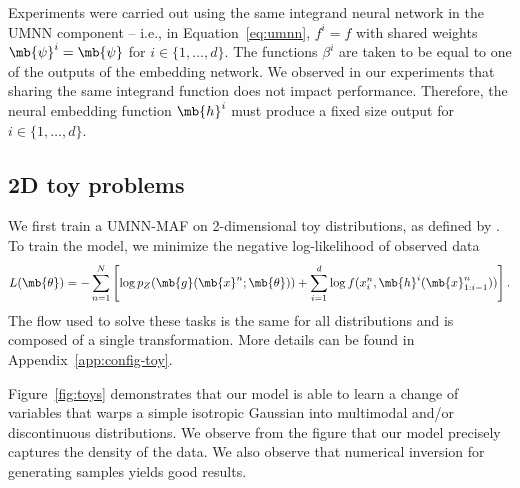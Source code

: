 Experiments were carried out using the same integrand neural network in the UMNN component -- i.e., in Equation~\ref{eq:umnn}, $f^i = f$ with shared weights $\mb{\psi}^i = \mb{\psi}$ for $i \in \{1, \hdots, d\}$.
The functions $\beta^i$ are taken to be equal to one of the outputs of the embedding network.
We observed in our experiments that sharing the same integrand function does not impact performance.
Therefore, the neural embedding function $\mb{h}^i$ must produce a fixed size output for  $i \in  \{1, \hdots, d\}$.


\subsection{2D toy problems}

We first train a UMNN-MAF on 2-dimensional toy distributions, as defined by \cite{grathwohl_ffjord_2018}.
To train the model, we minimize the negative log-likelihood of observed data
\begin{align}
    L(\mb{\theta}) = - \sum_{n=1}^{N}\left[ \log p_Z(\mb{g}(\mb{x}^n; \mb{\theta})) + \sum^d_{i=1} \log f(x_i^n, \mb{h}^i(\mb{x}_{1 : i-1}^n))\right]. \label{eq:loss_toy}
\end{align}
The flow used to solve these tasks is the same for all distributions and is composed of a single transformation. More details can be found in Appendix~\ref{app:config-toy}.

Figure~\ref{fig:toys} demonstrates that our model is able to learn a change of variables that warps a simple isotropic Gaussian into multimodal and/or discontinuous distributions.
We observe from the figure that our model precisely captures the density of the data.
We also observe that numerical inversion for generating samples yields good results.

